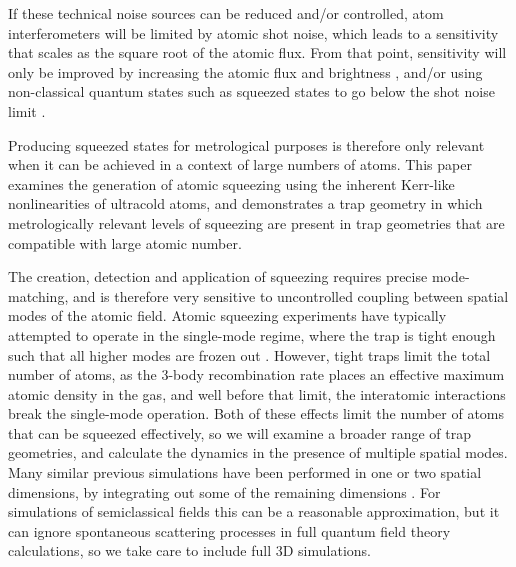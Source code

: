 \documentclass{iopart}
\begin{document}
If these technical noise sources can be reduced and/or controlled, atom interferometers will be limited by atomic shot noise, which leads to a sensitivity that scales as the square root of the atomic flux. From that point, sensitivity will only be improved by increasing the atomic flux and brightness \cite{semiclassicallimit2007, outcouplercomparison, jeppesenET2008}, and/or using non-classical quantum states such as squeezed states to go below the shot noise limit \cite{robins:2013}. 

Producing squeezed states for metrological purposes is therefore only relevant when it can be achieved in a context of large numbers of atoms.  This paper examines the generation of atomic squeezing using the inherent Kerr-like nonlinearities of ultracold atoms, and demonstrates a trap geometry in which metrologically relevant levels of squeezing are present in trap geometries that are compatible with large atomic number.

The creation, detection and application of squeezing requires precise mode-matching, and is therefore very sensitive to uncontrolled coupling between spatial modes of the atomic field.  Atomic squeezing experiments have typically attempted to operate in the single-mode regime, where the trap is tight enough such that all higher modes are frozen out \cite{LiET2009}.  However, tight traps limit the total number of atoms, as the 3-body recombination rate places an effective maximum atomic density in the gas, and well before that limit, the interatomic interactions break the single-mode operation.  Both of these effects limit the number of atoms that can be squeezed effectively, so we will examine a broader range of trap geometries, and calculate the dynamics in the presence of multiple spatial modes. Many similar previous simulations have been performed in one or two spatial dimensions, by integrating out some of the remaining dimensions \cite{Kheruntsyan:2005, johnssonET2007, haineET2009, kheruntsyanET2002}.  For simulations of semiclassical fields this can be a reasonable approximation, but it can ignore spontaneous scattering processes in full quantum field theory calculations, so we take care to include full 3D simulations. 
\end{document}

